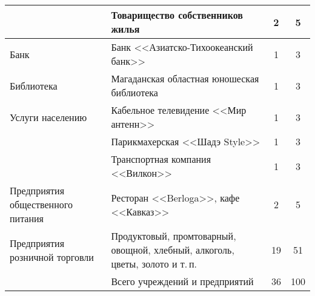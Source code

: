 \begin{table}[h!]
\begin{changemargin}{-1cm}{-1cm}
\begin{tabular}{p{5cm}p{7cm}cc}
                                        & Товарищество 				собственников жилья                                                                                                                      & 2               & 5               \\ \midrule
Банк                                    & Банк 				<<Азиатско-Тихоокеанский банк>>                                                                                                                    & 1               & 3               \\ \midrule
Библиотека                              & Магаданская 				областная юношеская библиотека                                                                                                            & 1               & 3               \\ \midrule
Услуги 				населению                    & Кабельное 				телевидение <<Мир антенн>>                                                                                                                    & 1               & 3               \\
                                        & Парикмахерская 				<<Шадэ Style>>                                                                                                                           & 1               & 3               \\
                                        & Транспортная 				компания <<Вилкон>>                                                                                                                        & 1               & 3               \\ \midrule
Предприятия 				общественного питания   & Ресторан 				<<Berloga>>, кафе <<Кавказ>>                                                                                                                     & 2               & 5               \\ \midrule
Предприятия 				розничной торговли      & Продуктовый, 				промтоварный, овощной, хлебный, 				алкоголь, цветы, золото и т.\,п.                                                                       & 19              & 51              \\  \bottomrule
                                        & Всего учреждений и предприятий                                                                                                                            & 36              & 100\\


                                        \bottomrule
\end{tabular}
\end{changemargin}
\end{table}
